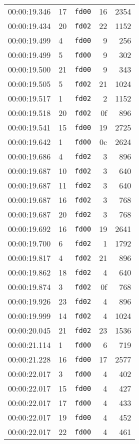 \documentclass{article}
\begin{document}
\begin{longtable}{lllrr}
00:00:19.346 & 17 & \texttt{fd00} & 16 & 2354 \\
00:00:19.434 & 20 & \texttt{fd02} & 22 & 1152 \\
00:00:19.499 & 4 & \texttt{fd00} & 9 & 256 \\
00:00:19.499 & 5 & \texttt{fd00} & 9 & 302 \\
00:00:19.500 & 21 & \texttt{fd00} & 9 & 343 \\
00:00:19.505 & 5 & \texttt{fd02} & 21 & 1024 \\
00:00:19.517 & 1 & \texttt{fd02} & 2 & 1152 \\
00:00:19.518 & 20 & \texttt{fd02} & 0f & 896 \\
00:00:19.541 & 15 & \texttt{fd00} & 19 & 2725 \\
00:00:19.642 & 1 & \texttt{fd00} & 0c & 2624 \\
00:00:19.686 & 4 & \texttt{fd02} & 3 & 896 \\
00:00:19.687 & 10 & \texttt{fd02} & 3 & 640 \\
00:00:19.687 & 11 & \texttt{fd02} & 3 & 640 \\
00:00:19.687 & 16 & \texttt{fd02} & 3 & 768 \\
00:00:19.687 & 20 & \texttt{fd02} & 3 & 768 \\
00:00:19.692 & 16 & \texttt{fd00} & 19 & 2641 \\
00:00:19.700 & 6 & \texttt{fd02} & 1 & 1792 \\
00:00:19.817 & 4 & \texttt{fd02} & 21 & 896 \\
00:00:19.862 & 18 & \texttt{fd02} & 4 & 640 \\
00:00:19.874 & 3 & \texttt{fd02} & 0f & 768 \\
00:00:19.926 & 23 & \texttt{fd02} & 4 & 896 \\
00:00:19.999 & 14 & \texttt{fd02} & 4 & 1024 \\
00:00:20.045 & 21 & \texttt{fd02} & 23 & 1536 \\
00:00:21.114 & 1 & \texttt{fd00} & 6 & 719 \\
00:00:21.228 & 16 & \texttt{fd00} & 17 & 2577 \\
00:00:22.017 & 3 & \texttt{fd00} & 4 & 402 \\
00:00:22.017 & 15 & \texttt{fd00} & 4 & 427 \\
00:00:22.017 & 17 & \texttt{fd00} & 4 & 433 \\
00:00:22.017 & 19 & \texttt{fd00} & 4 & 452 \\
00:00:22.017 & 22 & \texttt{fd00} & 4 & 461 \\

\end{longtable}
\end{document}

